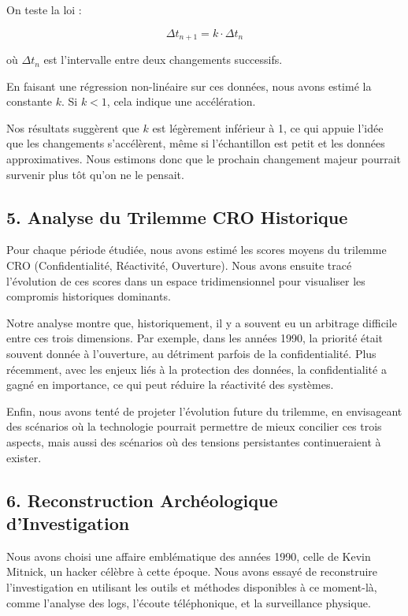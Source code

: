\documentclass[12pt,a4paper]{report}
\begin{document}
On teste la loi :

\[
\Delta t_{n+1} = k \cdot \Delta t_n
\]

où \(\Delta t_n\) est l’intervalle entre deux changements successifs.

En faisant une régression non-linéaire sur ces données, nous avons estimé la constante \(k\). Si \(k < 1\), cela indique une accélération.

Nos résultats suggèrent que \(k\) est légèrement inférieur à 1, ce qui appuie l’idée que les changements s’accélèrent, même si l’échantillon est petit et les données approximatives. Nous estimons donc que le prochain changement majeur pourrait survenir plus tôt qu’on ne le pensait.

\subsection*{5. Analyse du Trilemme CRO Historique}

Pour chaque période étudiée, nous avons estimé les scores moyens du trilemme CRO (Confidentialité, Réactivité, Ouverture). Nous avons ensuite tracé l’évolution de ces scores dans un espace tridimensionnel pour visualiser les compromis historiques dominants.

Notre analyse montre que, historiquement, il y a souvent eu un arbitrage difficile entre ces trois dimensions. Par exemple, dans les années 1990, la priorité était souvent donnée à l’ouverture, au détriment parfois de la confidentialité. Plus récemment, avec les enjeux liés à la protection des données, la confidentialité a gagné en importance, ce qui peut réduire la réactivité des systèmes.

Enfin, nous avons tenté de projeter l’évolution future du trilemme, en envisageant des scénarios où la technologie pourrait permettre de mieux concilier ces trois aspects, mais aussi des scénarios où des tensions persistantes continueraient à exister.

\subsection*{6. Reconstruction Archéologique d’Investigation}

Nous avons choisi une affaire emblématique des années 1990, celle de Kevin Mitnick, un hacker célèbre à cette époque. Nous avons essayé de reconstruire l’investigation en utilisant les outils et méthodes disponibles à ce moment-là, comme l’analyse des logs, l’écoute téléphonique, et la surveillance physique.
\end{document}
